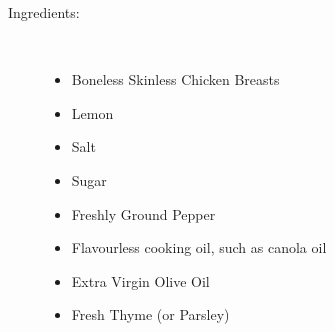 \documentclass[11pt,letterpaper]{article}
\begin{document}


\begin{description}

\item[Ingredients:]\ \\
	\begin{itemize}
	\item Boneless Skinless Chicken Breasts
	\item Lemon
	\item Salt
	\item Sugar
	\item Freshly Ground Pepper
	\item Flavourless cooking oil, such as canola oil
	\item Extra Virgin Olive Oil
	\item Fresh Thyme (or Parsley)
	\end{itemize}


\end{description}
\end{document}
